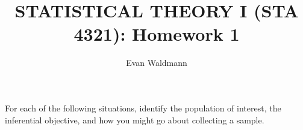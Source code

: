 \documentclass[10pt]{article}
\newenvironment{problem}[2][Problem]{\begin{trivlist}
		\item[\hskip \labelsep {\bfseries #1}\hskip \labelsep {\bfseries #2.}]}{\end{trivlist}}
\begin{document}
	
	\setlength{\topmargin}{0in}
	
	\setlength{\droptitle}{-10em} 
	\title{ STATISTICAL THEORY I (STA 4321): Homework 1 }
	\author{Evan Waldmann} %
	\maketitle
	
	
	\begin{problem}{1.1}
	For each of the following situations, identify the population of interest, the inferential objective, and how you might go about collecting a sample. 
	\end{problem}
	
\end{document}
